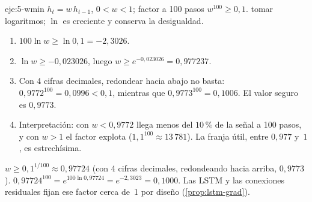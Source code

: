 \begin{solucion}{eje:5-wmin}
\datos $h_t=w\,h_{t-1}$, $0<w<1$; factor a 100 pasos $w^{100}\ge 0{,}1$.
\planteamiento tomar logaritmos; $\ln$ es creciente y conserva la desigualdad.
\pasos
\begin{enumerate}[label=\arabic*.]
  \item $100\ln w\ge\ln 0{,}1=-2{,}3026$.
  \item $\ln w\ge -0{,}023026$, luego $w\ge e^{-0{,}023026}=0{,}977237$.
  \item Con 4 cifras decimales, redondear hacia abajo no basta: $0{,}9772^{100}=0{,}0996<0{,}1$, mientras que $0{,}9773^{100}=0{,}1006$. El valor seguro es $0{,}9773$.
  \item Interpretación: con $w<0{,}9772$ llega menos del $10\,\%$ de la señal a 100 pasos, y con $w>1$ el factor explota ($1{,}1^{100}\approx 13\,781$). La franja útil, entre $0{,}977$ y~$1$, es estrechísima.
\end{enumerate}
\resultado \textbf{$w\ge 0{,}1^{1/100}\approx 0{,}97724$} (con 4 cifras decimales, redondeando hacia arriba, $0{,}9773$).
\comprobacion $0{,}97724^{100}=e^{100\ln 0{,}97724}=e^{-2{,}3023}=0{,}1000$. Las LSTM y las conexiones residuales fijan ese factor cerca de~1 por diseño (\cref{prop:lstm-grad}).
\end{solucion}

